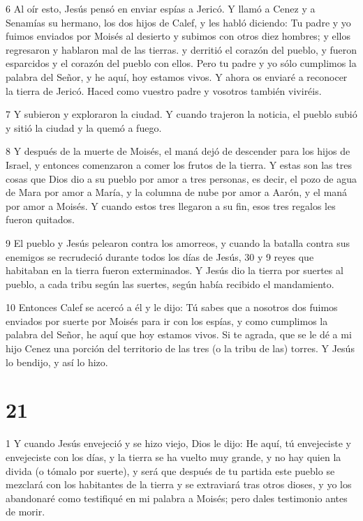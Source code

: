 \par 6 Al oír esto, Jesús pensó en enviar espías a Jericó. Y llamó a Cenez y a Senamías su hermano, los dos hijos de Calef, y les habló diciendo: Tu padre y yo fuimos enviados por Moisés al desierto y subimos con otros diez hombres; y ellos regresaron y hablaron mal de las tierras. y derritió el corazón del pueblo, y fueron esparcidos y el corazón del pueblo con ellos. Pero tu padre y yo sólo cumplimos la palabra del Señor, y he aquí, hoy estamos vivos. Y ahora os enviaré a reconocer la tierra de Jericó. Haced como vuestro padre y vosotros también viviréis.

\par 7 Y subieron y exploraron la ciudad. Y cuando trajeron la noticia, el pueblo subió y sitió la ciudad y la quemó a fuego.

\par 8 Y después de la muerte de Moisés, el maná dejó de descender para los hijos de Israel, y entonces comenzaron a comer los frutos de la tierra. Y estas son las tres cosas que Dios dio a su pueblo por amor a tres personas, es decir, el pozo de agua de Mara por amor a María, y la columna de nube por amor a Aarón, y el maná por amor a Moisés. Y cuando estos tres llegaron a su fin, esos tres regalos les fueron quitados.

\par 9 El pueblo y Jesús pelearon contra los amorreos, y cuando la batalla contra sus enemigos se recrudeció durante todos los días de Jesús, 30 y 9 reyes que habitaban en la tierra fueron exterminados. Y Jesús dio la tierra por suertes al pueblo, a cada tribu según las suertes, según había recibido el mandamiento.

\par 10 Entonces Calef se acercó a él y le dijo: Tú sabes que a nosotros dos fuimos enviados por suerte por Moisés para ir con los espías, y como cumplimos la palabra del Señor, he aquí que hoy estamos vivos. Si te agrada, que se le dé a mi hijo Cenez una porción del territorio de las tres (o la tribu de las) torres. Y Jesús lo bendijo, y así lo hizo.

\chapter{21}

\par 1 Y cuando Jesús envejeció y se hizo viejo, Dios le dijo: He aquí, tú envejeciste y envejeciste con los días, y la tierra se ha vuelto muy grande, y no hay quien la divida (o tómalo por suerte), y será que después de tu partida este pueblo se mezclará con los habitantes de la tierra y se extraviará tras otros dioses, y yo los abandonaré como testifiqué en mi palabra a Moisés; pero dales testimonio antes de morir.

